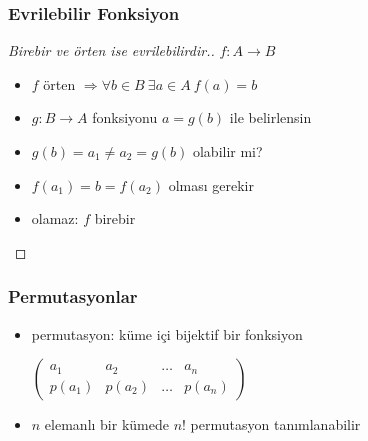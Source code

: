 \documentclass[dvipsnames]{beamer}
\theoremstyle{definition}
\theoremstyle{example}
\theoremstyle{plain}
\begin{document}
\begin{frame}
  \frametitle{Evrilebilir Fonksiyon}

  \begin{proof}[Birebir ve örten ise evrilebilirdir.]
    $f: A \rightarrow B$
    \begin{itemize}
      \item $f$ örten $\Rightarrow \forall b \in B~\exists a \in A~f(a)=b$
      \item $g: B \rightarrow A$ fonksiyonu $a=g(b)$ ile belirlensin

      \pause
      \medskip
      \item $g(b) = a_1 \neq a_2 = g(b)$ olabilir mi?

      \pause
      \item $f(a_1) = b = f(a_2)$ olması gerekir

      \pause
      \item olamaz: $f$ birebir
    \end{itemize}
  \end{proof}
\end{frame}

\begin{frame}
  \frametitle{Permutasyonlar}

  \begin{itemize}
    \item permutasyon: küme içi bijektif bir fonksiyon

    \medskip
    $\left(
      \begin{array}{cccc}
         a_1   &  a_2   & \dots &  a_n\\
        p(a_1) & p(a_2) & \dots & p(a_n)
      \end{array}
    \right)$

    \medskip
    \item $n$ elemanlı bir kümede $n!$ permutasyon tanımlanabilir
  \end{itemize}
\end{frame}
\end{document}
